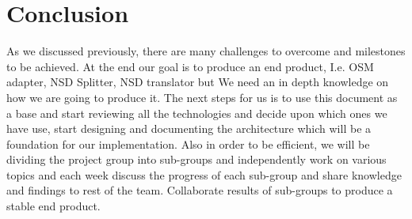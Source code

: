 \chapter{Conclusion}
\label{ch:Conclusion}
As we discussed previously, there are many challenges to overcome and milestones to be achieved.
At the end our goal is to produce an end product, I.e. OSM adapter, NSD Splitter, NSD translator but 
We need an in depth knowledge on how we are going to produce it. The next steps for us is to use this document as a base and start reviewing all the technologies and decide upon which ones we have use, start designing and documenting the architecture which will be a foundation for our implementation.
Also in order to be efficient, we will be dividing the project group into sub-groups and independently work on various topics and each week discuss the progress of each sub-group and share knowledge and findings to rest of the team. Collaborate results of sub-groups to produce a stable end product. 
